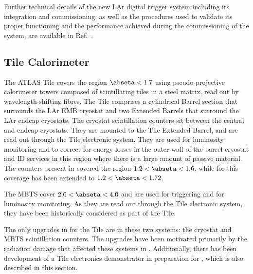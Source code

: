 \documentclass[cernpreprint, atlasdraft=false, UKenglish,british,orcidlogo, texmf, orcidlogo]{atlasdoc}
\begin{document}
 
 
 
 
 
 
 
 
 
 
 
 


 
 
Further technical details of the new LAr digital trigger system including
its integration and commissioning,
as well as the procedures used to validate its proper functioning and
the performance achieved during the commissioning of the system, are available
in Ref.~\cite{LArPhaseIPaper}.
 
 
 
\subsection{Tile Calorimeter}
\label{sec:tile}
 
The ATLAS \gls{Tile} covers the region $\abseta < 1.7$ using pseudo-projective calorimeter towers composed of scintillating tiles in a steel matrix, read out by wavelength-shifting fibres.
The \gls{Tile} comprises a cylindrical Barrel section that surrounds the \gls{LAr} \gls{EMB} cryostat and two Extended Barrels that surround the \gls{LAr} endcap cryostats.
The cryostat scintillation counters sit between the central and endcap cryostats. They are mounted to the \gls{Tile} Extended Barrel, and are read out through the \gls{Tile} electronic system. They are used for luminosity monitoring and to correct for energy losses in the outer wall of the barrel cryostat and \gls{ID} services in this region where there is a large amount of passive material.
The counters present in \RunOneTwo covered
the region $1.2 < \abseta < 1.6$, while for \RunThr this coverage has been extended to $1.2 < \abseta < 1.72$.
 
The \gls{MBTS} cover $2.0 < \abseta < 4.0$
and are used for triggering and for luminosity monitoring. As they are read out through the \gls{Tile} electronic system, they have been historically considered as part of the \gls{Tile}.
 
The only upgrades in \RunThr for the \gls{Tile} are in these two systems: the cryostat and \gls{MBTS} scintillation counters. The upgrades have been motivated primarily by the radiation damage that affected these systems in \RunTwo. Additionally, there has been development of a \gls{Tile} electronics demonstrator in preparation for \RunFour, which is also described in this section.
 
\end{document}
